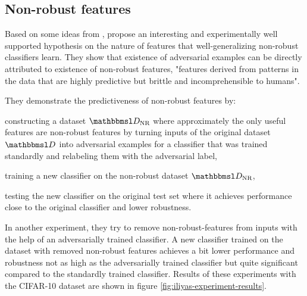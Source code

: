 \documentclass[conference,compsoc]{IEEEtran}
\begin{document}
\subsection{Non-robust features}

Based on some ideas from \citet{Tsipras:2018:RMBOA},  \citet{Ilyas:2019:AENBTF} propose an interesting and experimentally well supported hypothesis on the nature of features that well-generalizing non-robust classifiers learn. They show that existence of adversarial examples can be directly attributed to existence of  non-robust features, "features derived from patterns in the data that are highly predictive but brittle and incomprehensible to humans". 

They demonstrate the predictiveness of non-robust features by: 
\begin{solidenumerate}
	\item constructing a dataset $\set D_\text{NR}$ where approximately the only useful features are non-robust features by turning inputs of the original dataset $\set D$ into adversarial examples for a classifier that was trained standardly and relabeling them with the adversarial label,
	\item training a new classifier on the non-robust dataset $\set D_\text{NR}$,
	\item testing the new classifier on the original test set where it achieves performance close to the original classifier and lower robustness.
\end{solidenumerate}

In another experiment, they try to remove non-robust-features from inputs with the help of an adversarially trained classifier. A new classifier trained on the dataset with removed non-robust features achieves a bit lower performance and robustness not as high as the adversarially trained classifier but quite significant compared to the standardly trained classifier. Results of these experiments with the CIFAR-10 dataset \citep{Krizhevsky:2009:LMLFTI} are shown in figure \ref{fig:iliyas-experiment-results}.
\end{document}
